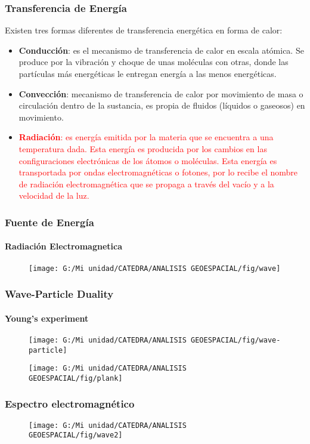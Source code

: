 \documentclass[14pt]{beamer}
\begin{document}
\begin{frame}
\frametitle{Transferencia de Energía}
\scriptsize{Existen tres formas diferentes de transferencia energética en forma de calor}:
\begin{itemize}
\item \textbf{Conducción}: es el mecanismo de transferencia de calor en escala atómica. Se produce por la vibración y  choque de unas moléculas con otras, donde las partículas más energéticas le entregan energía a las menos energéticas.
\item \textbf{Convección}: mecanismo de transferencia de calor por movimiento de masa o circulación dentro de la sustancia, es propia de fluidos (líquidos o gaseosos) en movimiento.
\item \textcolor{red}{\textbf{Radiación}: es energía emitida por la materia que se encuentra a una temperatura dada. Esta energía es producida por los cambios en las configuraciones electrónicas de los átomos o moléculas. Esta energía es transportada por ondas electromagnéticas o fotones, por lo recibe el nombre de radiación electromagnética que se propaga a través del vacío y a la velocidad de la luz.}
\end{itemize}
\end{frame}
\begin{frame}
\frametitle{Fuente de Energía}
\framesubtitle{Radiación Electromagnetica}
  \begin{figure}
    \centering
    \texttt{[image: G:/Mi unidad/CATEDRA/ANALISIS GEOESPACIAL/fig/wave]}
\tiny{}
 \end{figure}
\end{frame}
\begin{frame}
\frametitle{Wave-Particle Duality}
\framesubtitle{Young's experiment}
\begin{figure}
\centering
\texttt{[image: G:/Mi unidad/CATEDRA/ANALISIS GEOESPACIAL/fig/wave-particle]}
\end{figure}
\begin{figure}
\centering
\texttt{[image: G:/Mi unidad/CATEDRA/ANALISIS GEOESPACIAL/fig/plank]}
\end{figure}
\end{frame}
\begin{frame}
\frametitle{Espectro electromagnético}
  \begin{figure}
    \centering
    \texttt{[image: G:/Mi unidad/CATEDRA/ANALISIS GEOESPACIAL/fig/wave2]}
  \end{figure}
\end{frame}
\end{document}
